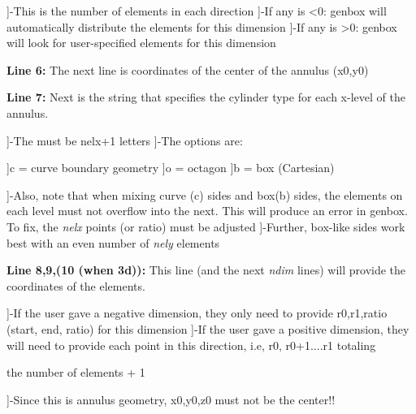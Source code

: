 \begin{description}]-This is the number of elements in each direction
  ]-If any is <0: genbox will automatically distribute the elements for this dimension
]-If any is >0: genbox will look for user-specified elements for this dimension
\end{description}
\par \textbf{Line 6:} The next line is coordinates of the center of the annulus (x0,y0)
\par \textbf{Line 7:} Next is the string that specifies the cylinder type for each x-level of the annulus.  

\begin{description}]-The must be nelx+1 letters
  ]-The options are: 
\begin{description}]c = curve boundary geometry
  ]o = octagon
]b = box (Cartesian)
\end{description}
]-Also, note that when mixing curve (c) sides and box(b) sides, the elements on each level must not overflow into the next.  This will produce an error in genbox.  To fix, the \textit{nelx} points (or ratio) must be adjusted
]-Further, box-like sides work best with an even number of \textit{nely} elements
\end{description}
\par \textbf{Line 8,9,(10 (when 3d)):} This line (and the next \textit{ndim} lines) will provide the coordinates of the elements.

\begin{description}]-If the user gave a negative dimension, they only need to provide r0,r1,ratio (start, end, ratio) for this dimension
  ]-If the user gave a positive dimension, they will need to provide each point in this direction, i.e, r0, r0+1....r1 totaling 
\end{description}
\par the number of elements + 1

\begin{description}]-Since this is annulus geometry, x0,y0,z0 must not be the center!!
\end{description}
